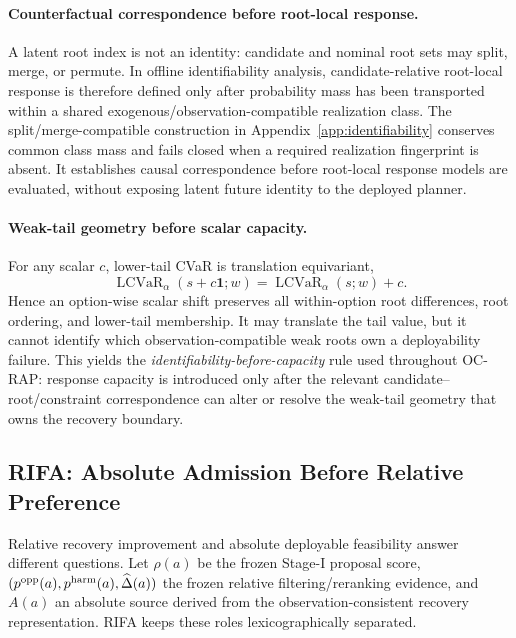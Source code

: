 \documentclass{article} %
\DeclareMathOperator{\LCVaR}{LCVaR}
\begin{document}
\paragraph{Counterfactual correspondence before root-local response.}
A latent root index is not an identity: candidate and nominal root sets may split, merge, or permute. In offline identifiability analysis, candidate-relative root-local response is therefore defined only after probability mass has been transported within a shared exogenous/observation-compatible realization class. The split/merge-compatible construction in Appendix~\ref{app:identifiability} conserves common class mass and fails closed when a required realization fingerprint is absent. It establishes causal correspondence before root-local response models are evaluated, without exposing latent future identity to the deployed planner.

\paragraph{Weak-tail geometry before scalar capacity.}
For any scalar $c$, lower-tail CVaR is translation equivariant,
\begin{equation}
 \LCVaR_\alpha(s+c\mathbf 1;w)=\LCVaR_\alpha(s;w)+c.
 \label{eq:translation_equivariance}
\end{equation}
Hence an option-wise scalar shift preserves all within-option root differences, root ordering, and lower-tail membership. It may translate the tail value, but it cannot identify which observation-compatible weak roots own a deployability failure. This yields the \emph{identifiability-before-capacity} rule used throughout OC-RAP: response capacity is introduced only after the relevant candidate--root/constraint correspondence can alter or resolve the weak-tail geometry that owns the recovery boundary.

\subsection{RIFA: Absolute Admission Before Relative Preference}
\label{subsec:rifa}

Relative recovery improvement and absolute deployable feasibility answer different questions. Let $\rho(a)$ be the frozen Stage-I proposal score, $(p^{\rm opp}(a),p^{\rm harm}(a),\widehat\Delta(a))$ the frozen relative filtering/reranking evidence, and $A(a)$ an absolute source derived from the observation-consistent recovery representation. RIFA keeps these roles lexicographically separated.
\end{document}
